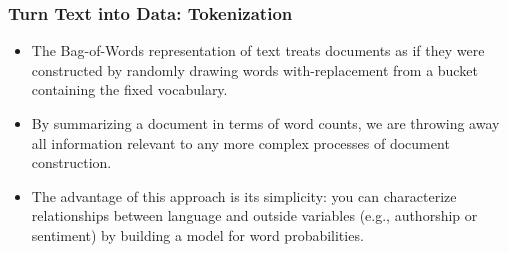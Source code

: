 \documentclass[
  shownotes,
  xcolor={svgnames},
  hyperref={colorlinks,citecolor=DarkBlue,linkcolor=DarkRed,urlcolor=DarkBlue}
  , aspectratio=169]{beamer}
\newcommand{\nv}{\color{Navy}}
\begin{document}
\begin{frame}[fragile]
\frametitle{Turn Text into Data: Tokenization}
\begin{itemize}
\item The {\nv Bag-of-Words} representation of text treats documents as if they were constructed by randomly drawing words with-replacement from a bucket containing the fixed vocabulary. 
\medskip
\item By summarizing a document in terms of word counts, we are throwing away all information relevant to any more complex processes of document construction. 
\medskip
\item The advantage of this approach is its simplicity: you can characterize relationships between language and outside variables (e.g., authorship or sentiment) by building a model for word probabilities.

\end{itemize}
\end{frame}
\end{document}
